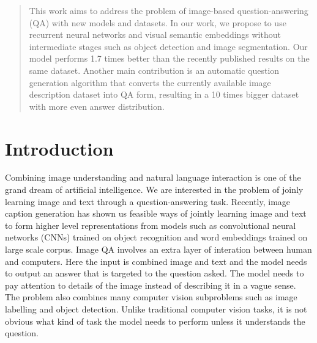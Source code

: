 \documentclass{article}
\renewcommand{\#}[1]{\textbf{#1}}
\begin{document}
 


\begin{abstract}
This work aims to address the problem of image-based question-answering (QA) with new models and datasets. In our work, we propose to use recurrent neural networks and visual semantic embeddings without intermediate stages such as object detection and image segmentation. Our model performs 1.7 times better than the recently published results on the same dataset. Another main contribution is an automatic question generation algorithm that converts the currently available image description dataset into QA form, resulting in a 10 times bigger dataset with more even answer distribution.
\end{abstract}

\section{Introduction}
Combining image understanding and natural language interaction is one of the grand dream of artificial intelligence. We are interested in the problem of joinly learning image and text through a question-answering task. Recently, image caption generation \cite{kiros14b,vinyals14,xu15} has shown us feasible ways of jointly learning image and text to form higher level representations  from models such as convolutional neural networks (CNNs) trained on object recognition and word embeddings trained on large scale corpus. Image QA involves an extra layer of interation between human and computers.  Here the input is combined image and text and the model needs to output an answer that is targeted to the question asked. The model needs to pay attention to details of the image instead of describing it in a vague sense. The problem also combines many computer vision subproblems such as image labelling and object detection. Unlike traditional computer vision tasks, it is not obvious what kind of task the model needs to perform unless it understands the question. 
\end{document}
